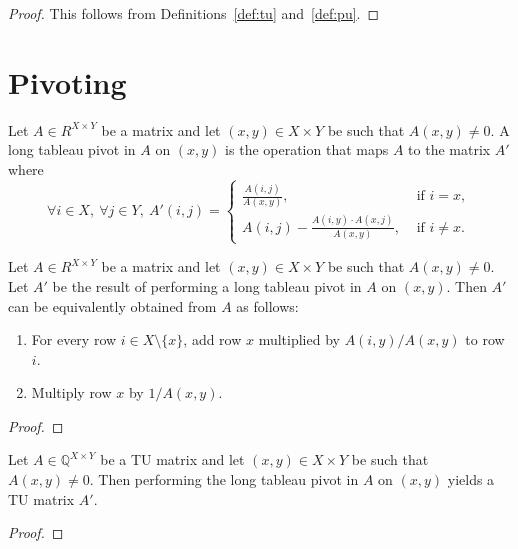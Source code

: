 \begin{proof}
    This follows from Definitions~\ref{def:tu} and~\ref{def:pu}.
\end{proof}


\section{Pivoting}


\begin{definition}\label{def:ltp}
    Let $A \in R^{X \times Y}$ be a matrix and let $(x, y) \in X \times Y$ be such that $A (x, y) \neq 0$. A long tableau pivot in $A$ on $(x, y)$ is the operation that maps $A$ to the matrix $A'$ where
    \[
        \forall i \in X, \ \forall j \in Y, \ A' (i, j) = \begin{cases}
            \frac{A (i, j)}{A (x, y)}, & \text{ if } i = x, \\
            A (i, j) - \frac{A (i, y) \cdot A (x, j)}{A (x, y)}, & \text{ if } i \neq x.
        \end{cases}
    \]
\end{definition}

\begin{lemma}\label{lem:ltp_eq}
    Let $A \in R^{X \times Y}$ be a matrix and let $(x, y) \in X \times Y$ be such that $A (x, y) \neq 0$. Let $A'$ be the result of performing a long tableau pivot in $A$ on $(x, y)$. Then $A'$ can be equivalently obtained from $A$ as follows:
    \begin{enumerate}
        \item For every row $i \in X \setminus \{x\}$, add row $x$ multiplied by $A (i, y) / A (x, y)$ to row $i$.
        \item Multiply row $x$ by $1 / A (x, y)$.
    \end{enumerate}
\end{lemma}

\begin{proof}
    \SeeLean
\end{proof}

\begin{lemma}\label{lem:ltp_tu}
    Let $A \in \mathbb{Q}^{X \times Y}$ be a TU matrix and let $(x, y) \in X \times Y$ be such that $A (x, y) \neq 0$. Then performing the long tableau pivot in $A$ on $(x, y)$ yields a TU matrix $A'$.
\end{lemma}

\begin{proof}
    \SeeLean
\end{proof}


